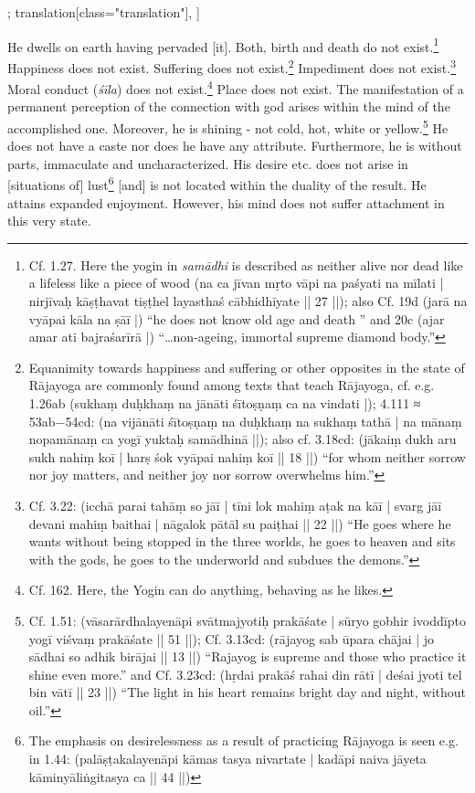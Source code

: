 \begin{alignment}[
  texts=edition[class="edition"];
  translation[class="translation"],
  ]
\begin{translation}
\begin{tlate}
  He dwells on earth having pervaded [it]. Both, birth and death do not exist.\footnote{Cf.  1.27. Here the yogin in \textit{samādhi} is described as neither alive nor dead like a lifeless like a piece of wood (na ca jīvan mṛto vāpi na paśyati na mīlati | nirjīvaḥ kāṣṭhavat tiṣṭhel layasthaś cābhidhīyate || 27 ||); also Cf.  19d (jarā na vyāpai kāla na ṣāī |) ``he does not know old age and death '' and 20c (ajar amar ati bajraśarīrā |) ``\ldots non-ageing, immortal supreme diamond body.''}\textsuperscript{\coro{[\lowroman{5}]}} Happiness does not exist. Suffering does not exist.\footnote{Equanimity towards happiness and suffering or other opposites in the state of Rājayoga are commonly found among texts that teach Rājayoga, cf. e.g.  1.26ab (sukhaṃ duḥkhaṃ na jānāti śītoṣṇaṃ ca na vindati |);  4.111 ≈  53ab−54cd: (na vijānāti śītoṣṇaṃ na duḥkhaṃ na sukhaṃ tathā | na mānaṃ nopamānaṃ ca yogī yuktaḥ samādhinā ||); also cf.  3.18cd: (jākaiṃ dukh aru sukh nahiṃ koī | harṣ śok vyāpai nahiṃ koī || 18 ||) ``for whom neither sorrow nor joy matters, and neither joy nor sorrow overwhelms him.''} Impediment does not exist.\footnote{Cf.  3.22: (icchā parai tahāṃ so jāī | tīni lok mahiṃ aṭak na kāī | svarg jāī devani mahiṃ baithai | nāgalok pātāl su paiṭhai || 22 ||) ``He goes where he wants without being stopped in the three worlds, he goes to heaven and sits with the gods, he goes to the underworld and subdues the demons.''} Moral conduct (\textit{śīla}) does not exist.\footnote{Cf.  162. Here, the Yogin can do anything, behaving as he likes.} Place does not exist.\textsuperscript{\coro{[\lowroman{10}]}} The manifestation of a permanent perception of the connection with god arises within the mind of the accomplished one. Moreover, he is shining - not cold, hot, white or yellow.\footnote{Cf.  1.51: (vāsarārdhalayenāpi svātmajyotiḥ prakāśate | sūryo gobhir ivoddīpto yogī viśvaṃ prakāśate || 51 ||); Cf.  3.13cd: (rājayog sab ūpara chājai | jo sādhai so adhik birājai || 13 ||) ``Rajayog is supreme and those who practice it shine even more.'' and Cf.  3.23cd: (hṛdai prakāś rahai din rātī | deśai jyoti tel bin vātī || 23 ||) ``The light in his heart remains bright day and night, without oil.''}
He does not have a caste nor does he have any attribute. Furthermore, he is without parts, immaculate and uncharacterized. His desire etc. does not arise in [situations of] lust\footnote{The emphasis on desirelessness as a result of practicing Rājayoga is seen e.g. in  1.44: (palāṣṭakalayenāpi kāmas tasya nivartate | kadāpi naiva jāyeta kāminyāliṅgitasya ca || 44 ||)} [and] is not located within the duality of the result.\textsuperscript{\coro{[\lowroman{15}]}} He attains expanded enjoyment. However, his mind does not suffer attachment in this very state.
\end{tlate}
\end{translation}
\end{alignment}
